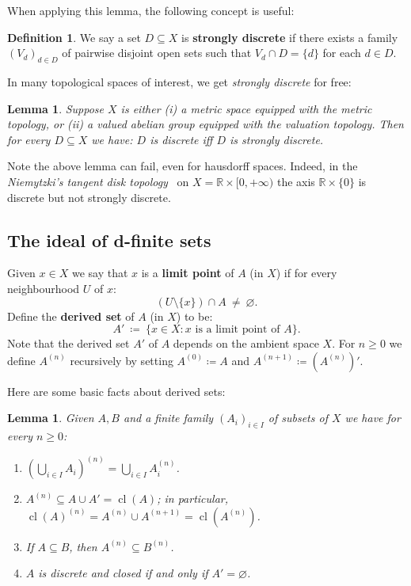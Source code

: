 \documentclass[11pt]{amsart}
\theoremstyle{plain}
\newtheorem{lemma}[thm]{Lemma}
\theoremstyle{definition}
\newtheorem{definition}[thm]{Definition}
\numberwithin{equation}{section}
\newcommand\R{\mathbb{R}}
\newcommand\0{\varnothing}
\DeclareMathOperator\cl{cl}
\begin{document}
\noindent
When applying this lemma, the following concept is useful:

\begin{definition}\label{def:stronglydiscrete}
We say a set $D\subseteq X$ is \textbf{strongly discrete} if there exists a family $(V_d)_{d\in D}$ of pairwise disjoint open sets such that $V_d\cap D=\{d\}$ for each $d\in D$.
\end{definition}

\noindent
In many topological spaces of interest, we get \emph{strongly discrete} for free:

\begin{lemma}\label{stronglydiscreteexamples}
Suppose $X$ is either (i) a metric space equipped with the metric topology, or (ii) a valued abelian group equipped with the valuation topology. Then for every $D\subseteq X$ we have: $D$ is discrete iff $D$ is strongly discrete.
\end{lemma}

\noindent
Note the above lemma can fail, even for hausdorff spaces. Indeed, in the  \emph{Niemytzki's tangent disk topology}~\cite[II.82]{steen1978counterexamples} on $X=\R\times[0,+\infty)$ the axis $\R\times \{0\}$ is discrete but not strongly discrete. 


\subsection{The ideal of d-finite sets}



Given $x\in X$ we say that $x$ is a \textbf{limit point} of $A$ (in $X$) if for every neighbourhood $U$ of $x$:
\[
(U\setminus\{x\})\cap A \ \neq \ \varnothing.
\]
Define the \textbf{derived set} of $A$ (in $X$) to be:
\[
A' \ \coloneqq \ \{x\in X:\text{$x$ is a limit point of $A$}\}.
\]
Note that the derived set $A'$ of $A$ depends on the ambient space $X$.
For $n\geq 0$ we define $A^{(n)}$ recursively by setting $A^{(0)}\coloneqq A$ and $A^{(n+1)}\coloneqq (A^{(n)})'$.


\medskip\noindent
Here are some basic facts about derived sets:

\begin{lemma}\label{CB_der_properties}
Given $A,B$ and a finite family $(A_i)_{i\in I}$ of subsets of $X$ we have for every $n\geq 0$:
\begin{enumerate}
\item\label{CB_der_commute_union} $(\bigcup_{i\in I}A_i)^{(n)}=\bigcup_{i\in I}A_i^{(n)}$.
\item\label{CB_der_closure_nth} $A^{(n)}\subseteq A\cup A'=\operatorname{cl}(A)$; in particular, $\operatorname{cl}(A)^{(n)}=A^{(n)}\cup A^{(n+1)}=\cl(A^{(n)})$.
\item\label{CB_der_monotone} If $A\subseteq B$, then $A^{(n)}\subseteq B^{(n)}$.
\item $A$ is discrete and closed if and only if $A'=\varnothing$.
\end{enumerate}
\end{lemma}
\end{document}
